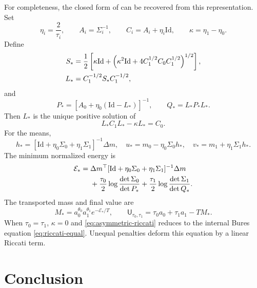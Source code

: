 \documentclass[11pt]{article}
\theoremstyle{definition}
\theoremstyle{remark}
\newcommand{\Id}{\mathrm{Id}}
\newcommand{\UOT}{\mathsf U}
\begin{document}
For completeness, the closed form of \citet{YangZhang2026} can be recovered
from this representation. Set
\begin{equation}\label{eq:asymmetric-shifts}
 \eta_i=\frac2{\tau_i},
 \qquad A_i=\Sigma_i^{-1},
 \qquad C_i=A_i+\eta_i\Id,
 \qquad \kappa=\eta_1-\eta_0.
\end{equation}
Define
\begin{align}
 S_*&=\frac12\left[
   \kappa\Id+
   \left(\kappa^2\Id+4C_1^{1/2}C_0C_1^{1/2}\right)^{1/2}
 \right],\notag\\
 L_*&=C_1^{-1/2}S_*C_1^{-1/2},
 \label{eq:asymmetric-L}
\end{align}
and
\begin{equation}\label{eq:asymmetric-PQ}
 P_*=[A_0+\eta_0(\Id-L_*)]^{-1},
 \qquad Q_*=L_*P_*L_*.
\end{equation}
Then $L_*$ is the unique positive solution of
\begin{equation}\label{eq:asymmetric-riccati}
 L_*C_1L_*-\kappa L_*=C_0.
\end{equation}
For the means,
\begin{equation}\label{eq:asymmetric-means}
 h_*=[\Id+\eta_0\Sigma_0+\eta_1\Sigma_1]^{-1}\Delta m,
 \quad
 u_*=m_0-\eta_0\Sigma_0h_*,
 \quad
 v_*=m_1+\eta_1\Sigma_1h_*.
\end{equation}
The minimum normalized energy is
\begin{align}
 \mathcal E_*
 ={}&\Delta m^\top
 [\Id+\eta_0\Sigma_0+\eta_1\Sigma_1]^{-1}\Delta m\notag\\
 &+\frac{\tau_0}{2}\log\frac{\det\Sigma_0}{\det P_*}
 +\frac{\tau_1}{2}\log\frac{\det\Sigma_1}{\det Q_*}.
 \label{eq:asymmetric-energy-value}
\end{align}
The transported mass and final value are
\begin{equation}\label{eq:asymmetric-mass-value}
 M_*=a_0^{\theta_0}a_1^{\theta_1}e^{-\mathcal E_*/T},
 \qquad
 \UOT_{\tau_0,\tau_1}=\tau_0a_0+\tau_1a_1-TM_*.
\end{equation}
When $\tau_0=\tau_1$, $\kappa=0$ and
\eqref{eq:asymmetric-riccati} reduces to the internal Bures equation
\eqref{eq:riccati-equal}. Unequal penalties deform this equation by a linear
Riccati term.

\section{Conclusion}
\end{document}
